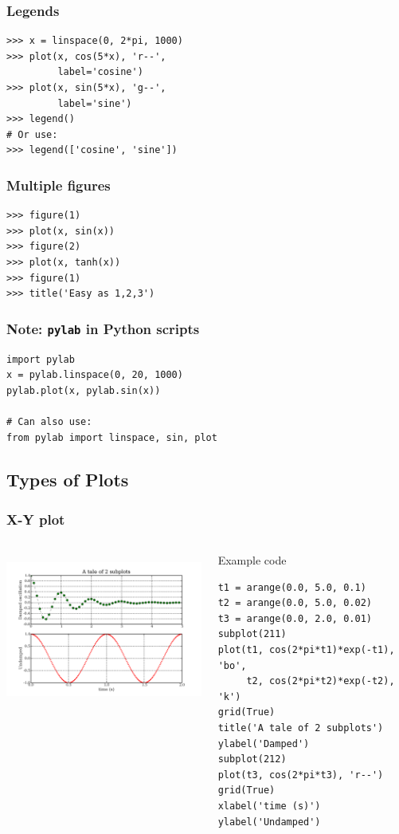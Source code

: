 \documentclass[14pt,compress]{beamer}
\newcounter{time}
\newcommand{\inctime}[1]{\addtocounter{time}{#1}{\tiny \thetime\ m}}
\newcommand{\typ}[1]{\texttt{#1}}
\begin{document}
\begin{frame}[fragile]
  \frametitle{Legends}
\begin{lstlisting}
>>> x = linspace(0, 2*pi, 1000)
>>> plot(x, cos(5*x), 'r--', 
         label='cosine')
>>> plot(x, sin(5*x), 'g--', 
         label='sine')
>>> legend() 
# Or use:
>>> legend(['cosine', 'sine'])
\end{lstlisting}
\end{frame}

\begin{frame}[fragile]
    \frametitle{Multiple figures}

\begin{lstlisting}
>>> figure(1)
>>> plot(x, sin(x))
>>> figure(2)
>>> plot(x, tanh(x))
>>> figure(1)
>>> title('Easy as 1,2,3')
\end{lstlisting}
    

\end{frame}

\begin{frame}[fragile]
    \frametitle{Note: \typ{pylab} in Python scripts}
\begin{lstlisting}
import pylab
x = pylab.linspace(0, 20, 1000)
pylab.plot(x, pylab.sin(x))

# Can also use:
from pylab import linspace, sin, plot
\end{lstlisting}
\inctime{5}
\end{frame}

\subsection{Types of Plots}
\begin{frame}[fragile]
  \frametitle{X-Y plot}
  \begin{columns}
    \hspace*{-0.5in}
    \includegraphics[height=2in, interpolate=true]{data/xyplot}
    \begin{block}{Example code}
    \tiny
\begin{lstlisting}
t1 = arange(0.0, 5.0, 0.1)
t2 = arange(0.0, 5.0, 0.02)
t3 = arange(0.0, 2.0, 0.01)
subplot(211)
plot(t1, cos(2*pi*t1)*exp(-t1), 'bo', 
     t2, cos(2*pi*t2)*exp(-t2), 'k')
grid(True)
title('A tale of 2 subplots')
ylabel('Damped')
subplot(212)
plot(t3, cos(2*pi*t3), 'r--')
grid(True)
xlabel('time (s)')
ylabel('Undamped')
\end{lstlisting}
    \end{block}
  \end{columns}
\end{frame}
\end{document}
